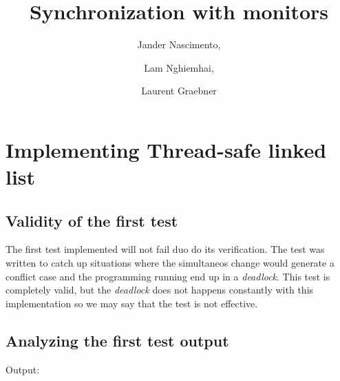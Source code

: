 \documentclass{article}
\begin{document}
\title{Synchronization with monitors}

\author{Jander Nascimento,
\and Lam Nghiemhai, 
\and Laurent Graebner}

\maketitle

\tableofcontents

\section{Implementing Thread-safe linked list}          

	\subsection{Validity of the first test}

		The first test implemented will not fail duo do its verification. The test was written
		to catch up situations where the simultaneos change would generate a conflict case and
		the programming running end up in a \textit{deadlock}.
		This test is completely valid, but the \textit{deadlock} does not happens constantly with 
		this implementation so we may say that the test is not effective.

	\subsection{Analyzing the first test output}

		Output:
\end{document}
